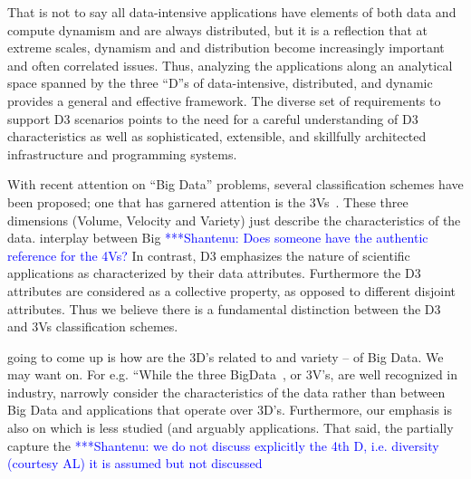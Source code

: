 \documentclass[times]{cpeauth}
\newcommand{\jhanote}[1]{ {\textcolor{blue} { ***Shantenu: #1 }}}
\newcommand{\ysnote}[1]{ {\textcolor{violet} { ***Yogesh: #1 }}}
\newcommand{\ysnote}[1]{} \fi
\begin{document}
That is not to say all data-intensive applications have elements of both data
and compute dynamism and are always distributed, but it is a reflection that at
extreme scales, dynamism and and distribution become increasingly important and
often correlated issues.  Thus, analyzing the applications along an analytical
space spanned by the three ``D''s of data-intensive, distributed, and dynamic
provides a general and effective framework.  The diverse set of requirements to
support D3 scenarios points to the need for a careful understanding of D3
characteristics as well as sophisticated, extensible, and skillfully architected
infrastructure and programming systems.

With recent attention on ``Big Data'' problems, several classification schemes
have been proposed; one that has garnered attention is the
3Vs~\cite{gartner3v}. These three dimensions (Volume, Velocity and Variety) just
describe the characteristics of the data. %
interplay between Big %
\jhanote{Does someone have the authentic reference for the 4Vs?}  In contrast, D3 emphasizes the nature of scientific
applications as characterized by their data attributes. Furthermore the D3
attributes are considered as a collective property, as opposed to different
disjoint attributes.  Thus we believe there is a fundamental distinction between
the D3 and 3Vs classification schemes.

going to come up is how are the 3D's related to %
and variety -- of Big Data. We may want %
on. For e.g. ``While the three %
BigData~\cite{gartner3v}, or 3V's, are well recognized in industry, %
narrowly consider the characteristics of the data rather than %
between Big Data and applications that operate over %
3D's. Furthermore, our emphasis is also on %
which is less studied (and arguably %
applications. That said, the %
partially capture the %
\jhanote{we do not discuss explicitly the 4th D, i.e. diversity (courtesy AL) it
is assumed but not discussed}
  
\end{document}
